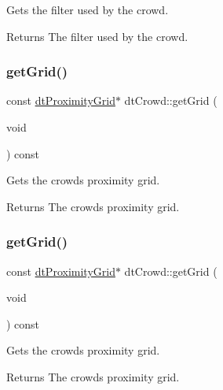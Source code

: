 Gets the filter used by the crowd. \begin{DoxyReturn}{Returns}
The filter used by the crowd. 
\end{DoxyReturn}
\mbox{\label{classdtCrowd_a1d1534a46f29afd4ab82ac37080c5ad0}} 
\subsubsection{\texorpdfstring{get\+Grid()}{getGrid()}\hspace{0.1cm}{\footnotesize\ttfamily [1/2]}}
{\footnotesize\ttfamily const \hyperlink{classdtProximityGrid}{dt\+Proximity\+Grid}$\ast$ dt\+Crowd\+::get\+Grid (\begin{DoxyParamCaption}\item[{void}]{ }\end{DoxyParamCaption}) const\hspace{0.3cm}{\ttfamily [inline]}}

Gets the crowd\textquotesingle{}s proximity grid. \begin{DoxyReturn}{Returns}
The crowd\textquotesingle{}s proximity grid. 
\end{DoxyReturn}
\mbox{\label{classdtCrowd_a1d1534a46f29afd4ab82ac37080c5ad0}} 
\subsubsection{\texorpdfstring{get\+Grid()}{getGrid()}\hspace{0.1cm}{\footnotesize\ttfamily [2/2]}}
{\footnotesize\ttfamily const \hyperlink{classdtProximityGrid}{dt\+Proximity\+Grid}$\ast$ dt\+Crowd\+::get\+Grid (\begin{DoxyParamCaption}\item[{void}]{ }\end{DoxyParamCaption}) const\hspace{0.3cm}{\ttfamily [inline]}}

Gets the crowd\textquotesingle{}s proximity grid. \begin{DoxyReturn}{Returns}
The crowd\textquotesingle{}s proximity grid. 
\end{DoxyReturn}
\mbox{\label{classdtCrowd_a4da076dabe04b63d801c63c99d2fb5bb}} 
